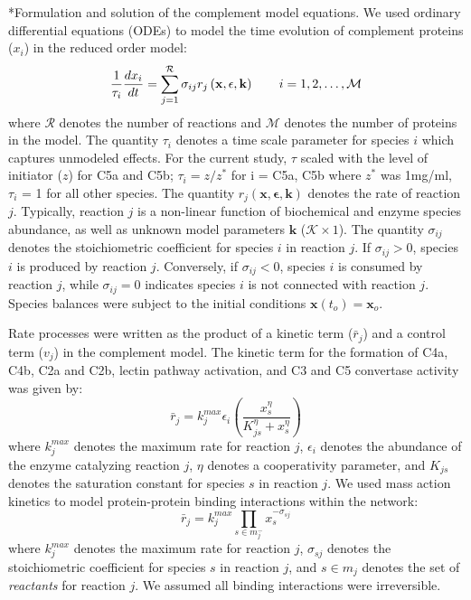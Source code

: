 \documentclass[12pt]{article}
\makeatletter
\renewcommand\subsection{\@startsection
	{subsection}{2}{0mm}
	{-0.05in}
	{-0.5\baselineskip}
	{\normalfont\normalsize\bfseries}}
\makeatother
\begin{document}
\subsection*{Formulation and solution of the complement model equations.}
We used ordinary differential equations (ODEs) to model the time evolution of complement proteins ($x_{i}$) in the reduced order model:
\begin{equation}
	\frac{1}{\tau_{i}}\frac{dx_{i}}{dt}  =  \sum_{j = 1}^{\mathcal{R}}\sigma_{ij}r_{j}\left(\mathbf{x},\mathbf{\epsilon},\mathbf{k}\right)\qquad{i=1,2,\hdots,\mathcal{M}}\\
\end{equation}
where $\mathcal{R}$ denotes the number of reactions and $\mathcal{M}$ denotes the number of proteins in the model.
The quantity $\tau_{i}$ denotes a time scale parameter for species $i$ which captures unmodeled effects.
For the current study, $\tau$ scaled with the level of initiator ($z$) for C5a and C5b; $\tau_{i}=z/z^{*}$ for i = C5a, C5b where $z^{*}$ was 1mg/ml, $\tau_{i}$ = 1 for all other species.
The quantity $r_{j}\left(\mathbf{x},\mathbf{\epsilon},\mathbf{k}\right)$ denotes the rate of reaction $j$.
Typically, reaction $j$ is a non-linear function of biochemical and enzyme species abundance, as well as unknown model parameters $\mathbf{k}$ ($\mathcal{K}\times{1}$).
The quantity $\sigma_{ij}$ denotes the stoichiometric coefficient for species $i$ in reaction $j$.
If $\sigma_{ij}>0$, species $i$ is produced by reaction $j$.
Conversely, if $\sigma_{ij}<0$, species $i$ is consumed by reaction $j$, while $\sigma_{ij} = 0$ indicates species $i$ is not connected with reaction $j$.
Species balances were subject to the initial conditions $\mathbf{x}\left(t_{o}\right) = \mathbf{x}_{o}$.

Rate processes were written as the product of a kinetic term ($\bar{r}_{j}$) and a control term ($v_{j}$) in the complement model.
The kinetic term for the formation of C4a, C4b, C2a and C2b, lectin pathway activation, and C3 and C5 convertase activity was given by:
\begin{equation}\label{eqn:rate-saturation}
	\bar{r}_{j} = k_{j}^{max}\epsilon_{i}\left(\frac{x_{s}^{\eta}}{K_{js}^{\eta} + x_{s}^{\eta}}\right)
\end{equation}
where $k_{j}^{max}$ denotes the maximum rate for reaction $j$, $\epsilon_{i}$ denotes the abundance of the enzyme catalyzing reaction $j$,
$\eta$ denotes a cooperativity parameter, and $K_{js}$ denotes the saturation constant for species $s$ in reaction $j$.
We used mass action kinetics to model protein-protein binding interactions within the network:
\begin{equation}\label{eqn:rate-action}
	\bar{r}_{j} = k_{j}^{max}\prod_{s\in{m_{j}^{-}}}x_{s}^{-\sigma_{sj}}
\end{equation}
where $k_{j}^{max}$ denotes the maximum rate for reaction $j$, $\sigma_{sj}$ denotes the stoichiometric coefficient for species $s$ in reaction $j$,
and $s\in{m_{j}}$ denotes the set of \textit{reactants} for reaction $j$. We assumed all binding interactions were irreversible.
\end{document}
